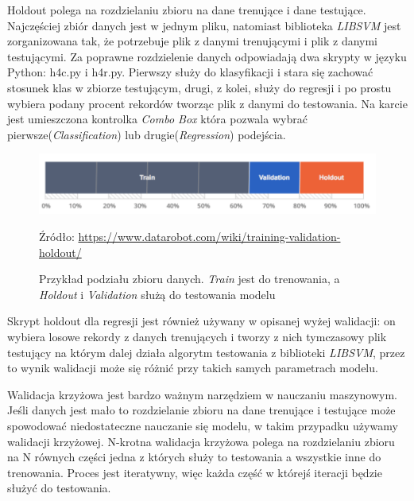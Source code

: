 \documentclass[paper=a4, fontsize=11pt]{scrartcl} %
\numberwithin{equation}{section} %
\numberwithin{figure}{section} %
\newcommand*{\captionsource}[2]{%
  \caption[{#1}]{%
      #1}
    Źródło: #2%
}
\begin{document}
    \par Holdout polega na rozdzielaniu zbioru na dane trenujące i dane testujące. Najczęściej
    zbiór danych jest w jednym pliku, natomiast biblioteka \textit{LIBSVM} jest zorganizowana
    tak, że potrzebuje plik z danymi trenującymi i plik z danymi testującymi. Za poprawne
    rozdzielenie danych odpowiadają dwa skrypty w języku Python: h4c.py i h4r.py. Pierwszy
    służy do klasyfikacji i stara się zachować stosunek klas w zbiorze testującym, drugi, z
    kolei, służy do regresji i po prostu wybiera podany procent rekordów tworząc plik z danymi
    do testowania. Na karcie jest umieszczona kontrolka \textit{Combo Box} która pozwala wybrać
    pierwsze(\textit{Classification}) lub drugie(\textit{Regression}) podejścia.

    \begin{figure}[H]
        \begin{center}
            \includegraphics[scale=0.5]{./img/train_validation_holdout.png}
            \captionsource{Przykład podziału zbioru danych. \textit{Train} jest do trenowania,
            a \textit{Holdout} i \textit{Validation} służą do testowania modelu}
            {\url{https://www.datarobot.com/wiki/training-validation-holdout/}}
            \label{fig:tr_val_hl}
        \end{center}
    \end{figure}

    \par Skrypt holdout dla regresji jest również używany w opisanej wyżej walidacji: on
    wybiera losowe rekordy z danych trenujących i tworzy z nich tymczasowy plik testujący na
    którym dalej działa algorytm testowania z biblioteki \textit{LIBSVM}, przez to wynik
    walidacji może się różnić przy takich samych parametrach modelu.

    \par Walidacja krzyżowa jest bardzo ważnym narzędziem w nauczaniu maszynowym. Jeśli danych
    jest mało to rozdzielanie zbioru na dane trenujące i testujące może spowodować
    niedostateczne nauczanie się modelu, w takim przypadku używamy walidacji krzyżowej.
    N-krotna walidacja krzyżowa polega na rozdzielaniu zbioru na N równych części jedna z
    których służy to testowania a wszystkie inne do trenowania. Proces jest iteratywny, więc
    każda część w którejś iteracji będzie służyć do testowania. 
\end{document}

